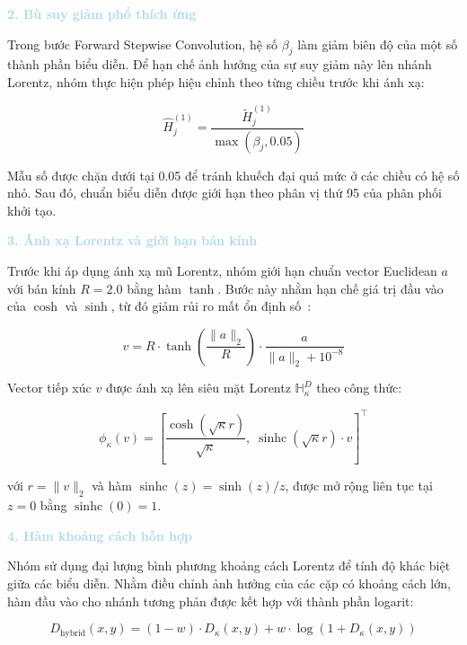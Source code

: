 \noindent\textcolor{lightblue}{\textbf{2. Bù suy giảm phổ thích ứng}}

Trong bước Forward Stepwise Convolution, hệ số $\beta_j$ làm giảm biên độ của một số thành phần biểu diễn. Để hạn chế ảnh hưởng của sự suy giảm này lên nhánh Lorentz, nhóm thực hiện phép hiệu chỉnh theo từng chiều trước khi ánh xạ:

\begin{equation}
\widehat{H}_j^{(1)}
=
\frac{\widetilde{H}_j^{(1)}}
{\max(\beta_j,0.05)}
\end{equation}

Mẫu số được chặn dưới tại 0.05 để tránh khuếch đại quá mức ở các chiều có hệ số nhỏ. Sau đó, chuẩn biểu diễn được giới hạn theo phân vị thứ 95 của phân phối khởi tạo.

\noindent\textcolor{lightblue}{\textbf{3. Ánh xạ Lorentz và giới hạn bán kính}}

Trước khi áp dụng ánh xạ mũ Lorentz, nhóm giới hạn chuẩn vector Euclidean $a$ với bán kính $R=2.0$ bằng hàm $\tanh$. Bước này nhằm hạn chế giá trị đầu vào của $\cosh$ và $\sinh$, từ đó giảm rủi ro mất ổn định số~\cite{mishne2023numerical}:


\begin{equation}
v
=
R\cdot
\tanh\left(
\frac{\lVert a\rVert_2}{R}
\right)
\cdot
\frac{a}
{\lVert a\rVert_2+10^{-8}}
\end{equation}

Vector tiếp xúc $v$ được ánh xạ lên siêu mặt Lorentz $\mathbb{H}_{\kappa}^{D}$ theo công thức:

\begin{equation}
\phi_{\kappa}(v)
=
\left[
\frac{\cosh(\sqrt{\kappa}r)}
{\sqrt{\kappa}},
\;
\operatorname{sinhc}(\sqrt{\kappa}r)\cdot v
\right]^{\top}
\end{equation}

với $r=\lVert v\rVert_2$ và hàm $\operatorname{sinhc}(z)=\sinh(z)/z$, được mở rộng liên tục tại $z=0$ bằng $\operatorname{sinhc}(0)=1$.

\noindent\textcolor{lightblue}{\textbf{4. Hàm khoảng cách hỗn hợp}}

Nhóm sử dụng đại lượng bình phương khoảng cách Lorentz để tính độ khác biệt giữa các biểu diễn. Nhằm điều chỉnh ảnh hưởng của các cặp có khoảng cách lớn, hàm đầu vào cho nhánh tương phản được kết hợp với thành phần logarit:

\begin{equation}
D_{\mathrm{hybrid}}(x,y)
=
(1-w)\cdot D_{\kappa}(x,y)
+
w\cdot\log\left(
1+D_{\kappa}(x,y)
\right)
\end{equation}

